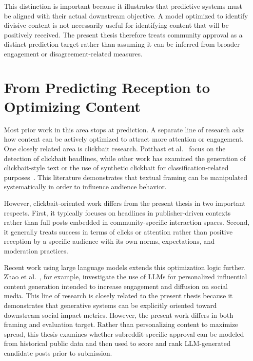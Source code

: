 This distinction is important because it illustrates that predictive systems must be aligned with their actual downstream objective. A model optimized to identify divisive content is not necessarily useful for identifying content that will be positively received. The present thesis therefore treats community approval as a distinct prediction target rather than assuming it can be inferred from broader engagement or disagreement-related measures.

\section{From Predicting Reception to Optimizing Content}

Most prior work in this area stops at prediction. A separate line of research asks how content can be actively optimized to attract more attention or engagement. One closely related area is clickbait research. Potthast et al.~\cite{potthast2016clickbait} focus on the detection of clickbait headlines, while other work has examined the generation of clickbait-style text or the use of synthetic clickbait for classification-related purposes~\cite{xu2019clickbait,shu2018deep}. This literature demonstrates that textual framing can be manipulated systematically in order to influence audience behavior.

However, clickbait-oriented work differs from the present thesis in two important respects. First, it typically focuses on headlines in publisher-driven contexts rather than full posts embedded in community-specific interaction spaces. Second, it generally treats success in terms of clicks or attention rather than positive reception by a specific audience with its own norms, expectations, and moderation practices.

Recent work using large language models extends this optimization logic further. Zhao et al.~\cite{zhao2025amplifying}, for example, investigate the use of LLMs for personalized influential content generation intended to increase engagement and diffusion on social media. This line of research is closely related to the present thesis because it demonstrates that generative systems can be explicitly oriented toward downstream social impact metrics. However, the present work differs in both framing and evaluation target. Rather than personalizing content to maximize spread, this thesis examines whether subreddit-specific approval can be modeled from historical public data and then used to score and rank LLM-generated candidate posts prior to submission.

